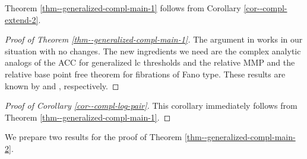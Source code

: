 \documentclass[12pt]{amsart}
\theoremstyle{definition}
\begin{document}
Theorem \ref{thm--generalized-compl-main-1} follows from Corollary \ref{cor--compl-extend-2}.  

\begin{proof}[Proof of Theorem \ref{thm--generalized-compl-main-1}]
The argument in \cite[Section 4]{filipazzi-moraga} works in our situation with no changes. 
The new ingredients we need are the complex analytic analogs of the ACC for generalized lc thresholds and the relative MMP and the relative base point free theorem for fibrations of Fano type. 
These results are known by \cite{hacon-xie-acc-lct} and \cite{fujino-analytic-bchm}, respectively. 
\end{proof}


\begin{proof}[Proof of Corollary \ref{cor--compl-log-pair}]
This corollary immediately follows from Theorem \ref{thm--generalized-compl-main-1}. 
\end{proof}

We prepare two results for the proof of Theorem \ref{thm--generalized-compl-main-2}. 
\end{document}
